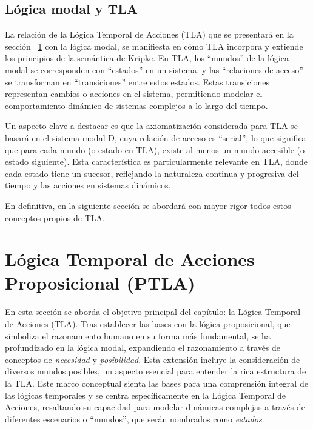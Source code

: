 \subsection{Lógica modal y TLA}\label{subsection:lmodalTLA}
La relación de la Lógica Temporal de Acciones (TLA) que se presentará en la sección ~\ref{section:TLA} con la lógica modal, se manifiesta en cómo TLA incorpora y extiende los principios de la semántica de Kripke. En TLA, los ``mundos'' de la lógica modal se corresponden con ``estados'' en un sistema, y las ``relaciones de acceso'' se transforman en ``transiciones'' entre estos estados. Estas transiciones representan cambios o acciones en el sistema, permitiendo modelar el comportamiento dinámico de sistemas complejos a lo largo del tiempo.

Un aspecto clave a destacar es que la axiomatización considerada para TLA se basará en el sistema modal D, cuya relación de acceso es ``serial'', lo que significa que para cada mundo (o estado en TLA), existe al menos un mundo accesible (o estado siguiente). Esta característica es particularmente relevante en TLA, donde cada estado tiene un sucesor, reflejando la naturaleza continua y progresiva del tiempo y las acciones en sistemas dinámicos. 

En definitiva, en la siguiente sección se abordará con mayor rigor todos estos conceptos propios de TLA.

\section{Lógica Temporal de Acciones Proposicional (PTLA)}\label{section:TLA}
En esta sección se aborda el objetivo principal del capítulo: la Lógica Temporal de Acciones (TLA). Tras establecer las bases con la lógica proposicional, que simboliza el razonamiento humano en su forma más fundamental, se ha profundizado en la lógica modal, expandiendo el razonamiento a través de conceptos de \textit{necesidad} y \textit{posibilidad}. Esta extensión incluye la consideración de diversos mundos posibles, un aspecto esencial para entender la rica estructura de la TLA. Este marco conceptual sienta las bases para una comprensión integral de las lógicas temporales y se centra específicamente en la Lógica Temporal de Acciones, resaltando su capacidad para modelar dinámicas complejas a través de diferentes escenarios o ``mundos'', que serán nombrados como \textit{estados}.

